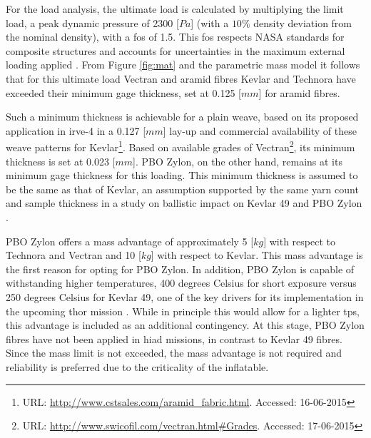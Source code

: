 For the load analysis, the ultimate load is calculated by multiplying the limit load, a peak dynamic pressure of 2300 [$Pa$] (with a $10\%$ density deviation from the nominal density), with a \acrfull{fos} of 1.5. This \gls{fos} respects NASA standards for composite structures and accounts for uncertainties in the maximum external loading applied \cite{Technical2014}.  
From Figure \ref{fig:mat} and the parametric mass model it follows that for this ultimate load Vectran and aramid fibres Kevlar and Technora have exceeded their minimum gage thickness, set at 0.125 [$mm$] for aramid fibres. 

Such a minimum thickness is achievable for a plain weave, based on its proposed application in \gls{irve}-4 in a 0.127 [$mm$] lay-up \cite{Litton2011} and commercial availability of these weave patterns for Kevlar\footnote{URL: \url{http://www.cstsales.com/aramid_fabric.html}. Accessed: 16-06-2015}. Based on available grades of Vectran\footnote{URL: \url{http://www.swicofil.com/vectran.html\#Grades}. Accessed: 17-06-2015}, its minimum thickness is set at 0.023 [$mm$]. PBO Zylon, on the other hand, remains at its minimum gage thickness for this loading. This minimum thickness is assumed to be the same as that of Kevlar, an assumption supported by the same yarn count and sample thickness in a study on ballistic impact on Kevlar 49 and PBO Zylon \cite{Pereira2009}. 

PBO Zylon offers a mass advantage of approximately 5 [$kg$] with respect to Technora and Vectran and 10 [$kg$] with respect to Kevlar. This mass advantage is the first reason for opting for PBO Zylon. In addition, PBO Zylon is capable of withstanding higher temperatures, 400 degrees Celsius for short exposure versus 250 degrees Celsius for Kevlar 49, one of the key drivers for its implementation in the upcoming \gls{thor} mission \cite{Dillman2014}. While in principle this would allow for a lighter \gls{tps}, this advantage is included as an additional contingency. At this stage, PBO Zylon fibres have not been applied in \gls{hiad} missions, in contrast to Kevlar 49 fibres. Since the mass limit is not exceeded, the mass advantage is not required and reliability is preferred due to the criticality of the inflatable. 


